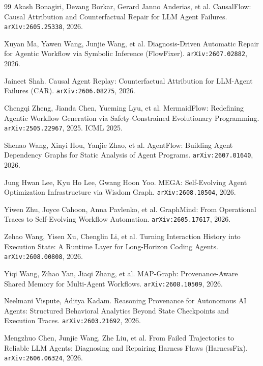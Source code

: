 \begin{thebibliography}{99}
 Akash Bonagiri, Devang Borkar, Gerard Janno
  Anderias, et al. CausalFlow: Causal Attribution and Counterfactual
  Repair for LLM Agent Failures. \texttt{arXiv:2605.25338}, 2026.

 Xuyan Ma, Yawen Wang, Junjie Wang, et al.
  Diagnosis-Driven Automatic Repair for Agentic Workflow via Symbolic
  Inference (FlowFixer). \texttt{arXiv:2607.02882}, 2026.

 Jaineet Shah. Causal Agent Replay: Counterfactual
  Attribution for LLM-Agent Failures (CAR). \texttt{arXiv:2606.08275},
  2026.

 Chengqi Zheng, Jianda Chen, Yueming Lyu, et al.
  MermaidFlow: Redefining Agentic Workflow Generation via
  Safety-Constrained Evolutionary Programming. \texttt{arXiv:2505.22967},
  2025. ICML 2025.

 Shenao Wang, Xinyi Hou, Yanjie Zhao, et al. AgentFlow:
  Building Agent Dependency Graphs for Static Analysis of Agent Programs.
  \texttt{arXiv:2607.01640}, 2026.

 Jung Hwan Lee, Kyu Ho Lee, Gwang Hoon Yoo. MEGA:
  Self-Evolving Agent Optimization Infrastructure via Wisdom Graph.
  \texttt{arXiv:2608.10504}, 2026.

 Yiwen Zhu, Joyce Cahoon, Anna Pavlenko, et al.
  GraphMind: From Operational Traces to Self-Evolving Workflow
  Automation. \texttt{arXiv:2605.17617}, 2026.

 Zehao Wang, Yisen Xu, Chenglin Li, et al. Turning
  Interaction History into Execution State: A Runtime Layer for
  Long-Horizon Coding Agents. \texttt{arXiv:2608.00808}, 2026.

 Yiqi Wang, Zihao Yan, Jiaqi Zhang, et al. MAP-Graph:
  Provenance-Aware Shared Memory for Multi-Agent Workflows.
  \texttt{arXiv:2608.10509}, 2026.

 Neelmani Vispute, Aditya Kadam. Reasoning Provenance for
  Autonomous AI Agents: Structured Behavioral Analytics Beyond State
  Checkpoints and Execution Traces. \texttt{arXiv:2603.21692}, 2026.

 Mengzhuo Chen, Junjie Wang, Zhe Liu, et al. From
  Failed Trajectories to Reliable LLM Agents: Diagnosing and Repairing
  Harness Flaws (HarnessFix). \texttt{arXiv:2606.06324}, 2026.


\end{thebibliography}
